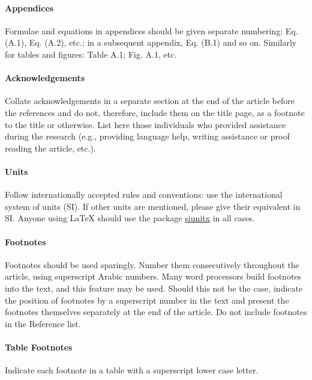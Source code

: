\paragraph{Appendices}

Formulae and equations in appendices should be given separate numbering: Eq. (A.1), Eq. (A.2), etc.; in a subsequent appendix, Eq. (B.1) and so on. Similarly for tables and figures: Table A.1; Fig. A.1, etc.

\paragraph{Acknowledgements}

Collate acknowledgements in a separate section at the end of the article before the references and do not, therefore, include them on the title page, as a footnote to the title or otherwise. List here those individuals who provided assistance during the research (e.g., providing language help, writing assistance or proof reading the article, etc.).

\paragraph{Units}

Follow internationally accepted rules and conventions: use the international system of units (SI). If other units are mentioned, please give their equivalent in SI. Anyone using \LaTeX{} should use the package \href{https://www.ctan.org/pkg/siunitx?lang=en}{siunitx} in all cases.

\paragraph{Footnotes}

Footnotes should be used sparingly. Number them consecutively throughout the article, using superscript Arabic numbers. Many word processors build footnotes into the text, and this feature may be used. Should this not be the case, indicate the position of footnotes by a superscript number in the text and present the footnotes themselves separately at the end of the article. Do not include footnotes in the Reference list.

\paragraph{Table Footnotes}

Indicate each footnote in a table with a superscript lower case letter.

